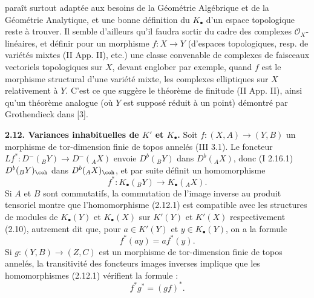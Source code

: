 paraît surtout adaptée aux besoins de la Géométrie Algébrique et de la Géométrie Analytique, et une bonne définition du \(K_{\bullet}\) d'un espace topologique reste à trouver. Il semble d'ailleurs qu'il faudra sortir du cadre des complexes \(\mathcal O_X\)-linéaires, et définir pour un morphisme \(f:X\to Y\) (d'espaces topologiques, resp. de variétés mixtes (II App. II), etc.) une classe convenable de complexes de faisceaux vectoriels topologiques sur \(X\), devant englober par exemple, quand \(f\) est le morphisme structural d'une variété mixte, les complexes elliptiques sur \(X\) relativement à \(Y\). C'est ce que suggère le théorème de finitude (II App. II), ainsi qu'un théorème analogue (où \(Y\) est supposé réduit à un point) démontré par Grothendieck dans [3].

\textbf{2.12. Variances inhabituelles de \(K'\) et \(K_{\bullet}\).} Soit \(f:(X,A)\longrightarrow(Y,B)\) un morphisme de tor-dimension finie de topos annelés (III 3.1). Le foncteur \(Lf^*:D^-({}_B Y)\longrightarrow D^-({}_A X)\) envoie \(D^b({}_B Y)\) dans \(D^b({}_A X)\), donc (I 2.16.1) \(D^b({}_B Y)_{\coh}\) dans \(D^b({}_A X)_{\coh}\), et par suite définit un homomorphisme
\begin{equation}\tag{2.12.1}
 f^*:K_\bullet({}_B Y)\longrightarrow K_\bullet({}_A X).
\end{equation}
Si \(A\) et \(B\) sont commutatifs, la commutation de l'image inverse au produit tensoriel montre que l'homomorphisme (2.12.1) est compatible avec les structures de modules de \(K_{\bullet}(Y)\) et \(K_{\bullet}(X)\) sur \(K'(Y)\) et \(K'(X)\) respectivement (2.10), autrement dit que, pour \(a\in K'(Y)\) et \(y\in K_{\bullet}(Y)\), on a la formule
\begin{equation}\tag{2.12.2}
 f^*(ay)=a f^*(y).
\end{equation}
Si \(g:(Y,B)\to(Z,C)\) est un morphisme de tor-dimension finie de topos annelés, la transitivité des foncteurs images inverses implique que les homomorphismes (2.12.1) vérifient la formule :
\begin{equation}\tag{2.12.1.1}
 f^*g^*=(gf)^*.
\end{equation}


